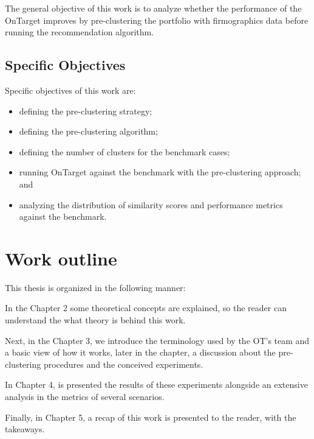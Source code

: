 The general objective of this work is to analyze whether the performance of the OnTarget improves by pre-clustering the portfolio with firmographics data before running the recommendation algorithm.

\subsection{Specific Objectives}

Specific objectives of this work are:

\begin{itemize}
    \item defining the pre-clustering strategy;
	\item defining the pre-clustering algorithm;
    \item defining the number of clusters for the benchmark cases;
    \item running OnTarget against the benchmark with the pre-clustering approach; and
    \item analyzing the distribution of similarity scores and performance metrics against the benchmark.
\end{itemize}


\section{Work outline}

This thesis is organized in the following manner: 

In the Chapter 2 some theoretical concepts are explained, so the reader can understand the what theory is behind this work. 

Next, in the Chapter 3, we introduce the terminology used by the OT's team and a basic view of how it works, later in the chapter, a discussion about the pre-clustering procedures and the conceived experiments.

In Chapter 4, is presented the results of these experiments alongside an extensive analysis in the metrics of several scenarios. 
 
Finally, in Chapter 5, a recap of this work is presented to the reader, with the takeaways. 